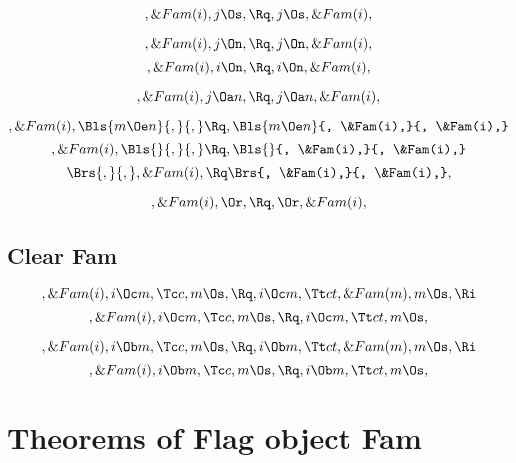 \[, \&Fam(i), j \Os, \Rq , j \Os, \&Fam(i),\]

\[, \&Fam(i), j \On, \Rq , j \On, \&Fam(i),\]
\[, \&Fam(i), i \On, \Rq , i \On, \&Fam(i),\]

\[, \&Fam(i), j \Oa n, \Rq , j \Oa n, \&Fam(i),\]

\bigskip
\[, \&Fam(i), \Bls{m \Oe n}{,}{,} \Rq , \Bls{m \Oe n}{, \&Fam(i),}{, \&Fam(i),}\]
\bigskip
\[, \&Fam(i), \Bls{}{,}{,} \Rq , \Bls{}{, \&Fam(i),}{, \&Fam(i),}\]
\bigskip
\[ \Brs{,}{,}, \&Fam(i), \Rq \Brs{, \&Fam(i),}{, \&Fam(i),},\]

\[, \&Fam(i), \Or, \Rq , \Or, \&Fam(i),\]


\bigskip
\bigskip
\subsection{Clear Fam}

\[, \&Fam(i), i \Oc m, \Tc c, m \Os, \Rq , i \Oc m, \Tt ct, \&Fam(m), m \Os, \Ri \]
\[, \&Fam(i), i \Oc m, \Tc c, m \Os, \Rq , i \Oc m, \Tt ct, m \Os,\]



\[, \&Fam(i), i \Ob m, \Tc c, m \Os, \Rq , i \Ob m, \Tt ct, \&Fam(m), m \Os, \Ri \]
\[, \&Fam(i), i \Ob m, \Tc c, m \Os, \Rq , i \Ob m, \Tt ct, m \Os,\]








\bigskip
\bigskip
\section{Theorems of Flag object Fam}



